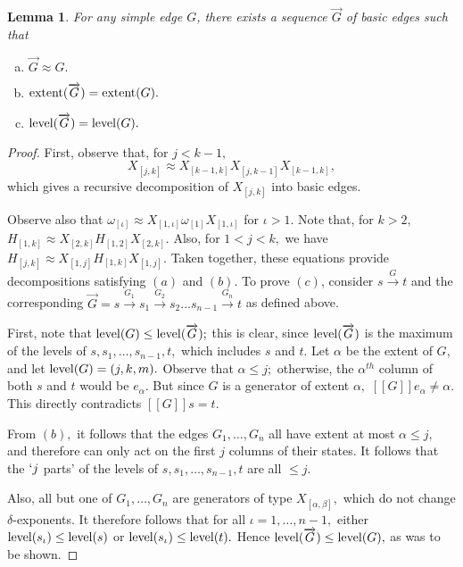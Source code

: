 \documentclass{dalthesis}
\theoremstyle{theorem}
\newtheorem{lemma}[theorem]{Lemma}
\theoremstyle{definition}
\theoremstyle{definition}  %
\theoremstyle{definition}
\newcommand{\sem}[1]{[\![#1]\!]}
\newcommand{\jay}{j}
\newcommand{\kay}{k}
\renewcommand{\:}{\mathbin{:}}
\newcommand{\level}{\mathop{\rm level}\nolimits}
\newcommand{\extent}{\mathop{\rm extent}\nolimits}
\newcommand{\edge}{\xrightarrow}
\renewcommand{\vec}{\overrightarrow}
\begin{document}
\begin{lemma}
\label{BasicGenLemma}
For any simple edge $G$, there exists a sequence $\vec{G}$ of basic edges such that
\begin{enumerate}[(a)]
\item $\vec{G}\approx G.$
\item $\extent(\vec{G})=\extent(G).$
\item $\level(\vec{G})=\level(G).$
\end{enumerate}
\end{lemma}
\begin{proof}
First, observe that, for $\jay < \kay - 1,$ \[X_{[\jay,\kay]} \approx X_{[\kay-1,\kay]}X_{[\jay,\kay-1]}X_{[\kay-1,\kay]},\] which gives a recursive decomposition of $X_{[\jay,\kay]}$ into basic edges.

Observe also that $\omega_{[\iota]} \approx X_{[1,\iota]}\omega_{[1]}X_{[1,\iota]}$ for $\iota>1.$ Note that, for $\kay > 2,$ $H_{[1,\kay]} \approx X_{[2,\kay]}H_{[1,2]}X_{[2,\kay]}.$ Also, for $1 < \jay < \kay,$ we have $H_{[\jay,\kay]}\approx X_{[1,\jay]}H_{[1,\kay]}X_{[1,\jay]}.$ Taken together, these equations provide decompositions satisfying $(a)$ and $(b).$ To prove $(c)$, consider $s\edge{G}t$ and the corresponding $\vec{G} = s\edge{G_1}s_1\edge{G_2}s_2\ldots s_{n-1}\edge{G_n}t$ as defined above.

First, note that $\level(G)\leq\level(\vec{G});$ this is clear, since $\level(\vec{G})$ is the maximum of the levels of $s,s_1,\ldots ,s_{n-1},t,$ which includes $s$ and $t.$ Let $\alpha$ be the extent of $G$, and let $\level(G) = (\jay,\kay,m).$ Observe that $\alpha\leq\jay;$ otherwise, the $\alpha^{th}$ column of both $s$ and $t$ would be $e_\alpha.$ But since $G$ is a generator of extent $\alpha,$ $\sem{G}e_\alpha\neq\alpha.$ This directly contradicts $\sem{G}s=t.$

From $(b),$ it follows that the edges $G_1,\ldots ,G_n$ all have extent at most $\alpha\leq j,$ and therefore can only act on the first $\jay$ columns of their states. It follows that the $`\jay$ parts' of the levels of $s,s_1,\ldots ,s_{n-1},t$ are all $\leq\jay.$

Also, all but one of $G_1,\ldots ,G_n$ are generators of type $X_{[\alpha,\beta]},$ which do not change $\delta$-exponents. It therefore follows that for all $\iota = 1,\ldots ,n-1,$ either $\level(s_\iota)\leq\level(s)$ or $\level(s_\iota)\leq\level(t).$ Hence $\level(\vec{G})\leq\level(G),$ as was to be shown.
\end{proof}
\end{document}
